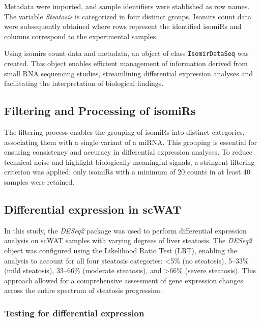 \documentclass[
  11pt,
  letterpaper,
]{book}
\begin{document}
Metadata were imported, and sample identifiers were stablished as row
names. The variable \emph{Steatosis} is categorized in four distinct
groups. Isomirs count data were subsequently obtained where rows
represent the identified isomiRs and columns correspond to the
experimental samples.

Using isomirs count data and metadata, an object of class
\texttt{IsomirDataSeq} was created. This object enables efficient
management of information derived from small RNA sequencing studies,
streamlining differential expression analyses and facilitating the
interpretation of biological findings.

\subsection{Filtering and Processing of
isomiRs}\label{filtering-and-processing-of-isomirs}

The filtering process enables the grouping of isomiRs into distinct
categories, associating them with a single variant of a miRNA. This
grouping is essential for ensuring consistency and accuracy in
differential expression analyses. To reduce technical noise and
highlight biologically meaningful signals, a stringent filtering
criterion was applied: only isomiRs with a minimum of 20 counts in at
least 40 samples were retained.

\subsection{Differential expression in
scWAT}\label{differential-expression-in-scwat}

In this study, the \emph{DESeq2} package was used to perform
differential expression analysis on scWAT samples with varying degrees
of liver steatosis. The \emph{DESeq2} object was configured using the
Likelihood Ratio Test (LRT), enabling the analysis to account for all
four steatosis categories: \textless5\% (no steatosis), 5--33\% (mild
steatosis), 33--66\% (moderate steatosis), and \textgreater66\% (severe
steatosis). This approach allowed for a comprehensive assessment of gene
expression changes across the entire spectrum of steatosis progression.

\subsubsection{Testing for differential
expression}\label{testing-for-differential-expression}
\end{document}

